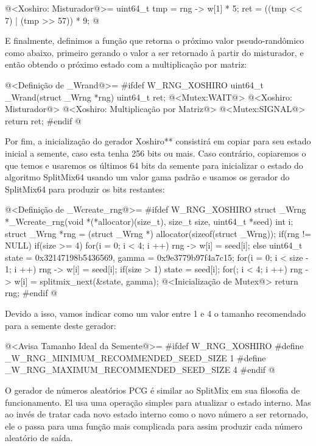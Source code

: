 \iniciocodigo
@<Xoshiro: Misturador@>=
{
  uint64_t tmp = rng -> w[1] * 5;
  ret = ((tmp << 7) | (tmp >> 57)) * 9;
} 
@
\fimcodigo

E finalmente, definimos a função que retorna o próximo valor
pseudo-randômico como abaixo, primeiro gerando o valor a ser
retornado  à partir do misturador, e então obtendo o
próximo estado com a multiplicação por matriz:

\iniciocodigo
@<Definição de \_Wrand@>=
#ifdef W_RNG_XOSHIRO
uint64_t _Wrand(struct _Wrng *rng){
  uint64_t ret;
  @<Mutex:WAIT@>
  @<Xoshiro: Misturador@>
  @<Xoshiro: Multiplicação por Matriz@>
  @<Mutex:SIGNAL@>
  return ret;
}
#endif
@
\fimcodigo


Por fim, a inicialização do gerador Xoshiro** consistirá em copiar
para seu estado inicial a semente, caso esta tenha 256 bits ou
mais. Caso contrário, copiaremos o que temos e usaremos os últimos 64
bits da semente para inicializar o estado do algoritmo SplitMix64
usando um valor gama padrão e usamos os gerador do SplitMix64 para
produzir os bits restantes:

\iniciocodigo
@<Definição de \_Wcreate\_rng@>=
#ifdef W_RNG_XOSHIRO
struct _Wrng *_Wcreate_rng(void *(*allocator)(size_t), size_t size,
                           uint64_t *seed){
  int i;
  struct _Wrng *rng = (struct _Wrng *) allocator(sizeof(struct _Wrng));
  if(rng != NULL){
    if(size >= 4){
      for(i = 0; i < 4; i ++)
        rng -> w[i] = seed[i];
    }
    else{
      uint64_t state = 0x32147198b5436569, gamma = 0x9e3779b97f4a7c15;
      for(i = 0; i < size - 1; i ++)
        rng -> w[i] = seed[i];
      if(size > 1)
        state = seed[i];
      for(; i < 4; i ++)
        rng -> w[i] = splitmix_next(&state, gamma);
    }
    @<Inicialização de Mutex@>
  }
  return rng;
}
#endif
@
\fimcodigo

Devido a isso, vamos indicar como um valor entre 1 e 4 o tamanho
recomendado para a semente deste gerador:

\iniciocodigo
@<Avisa Tamanho Ideal da Semente@>=
#ifdef W_RNG_XOSHIRO
#define _W_RNG_MINIMUM_RECOMMENDED_SEED_SIZE  1
#define _W_RNG_MAXIMUM_RECOMMENDED_SEED_SIZE  4
#endif
@
\fimcodigo



O gerador de números aleatórios PCG é similar ao SplitMix em sua
filosofia de funcionamento. El usa uma operação simples para atualizar
o estado interno. Mas ao invés de tratar cada novo estado interno como
o novo número a ser retornado, ele o passa para uma função mais
complicada para assim produzir cada número aleatório de saída.

